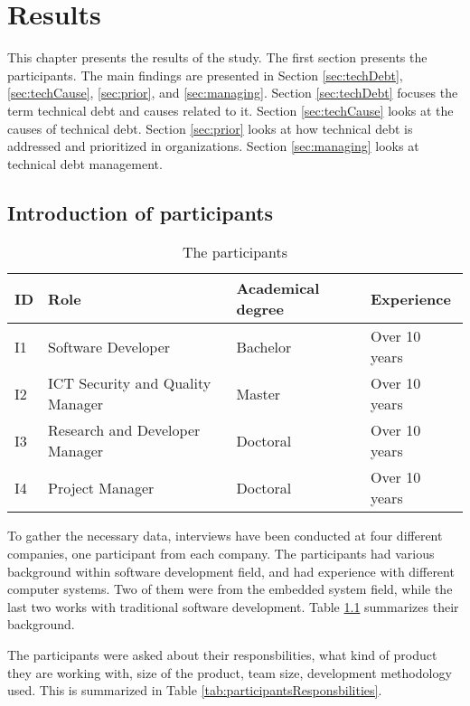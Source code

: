 \chapter{Results}
This chapter presents the results of the study. The first section presents the participants. The main findings are presented in Section \ref{sec:techDebt}, \ref{sec:techCause}, \ref{sec:prior}, and \ref{sec:managing}. Section \ref{sec:techDebt} focuses the term technical debt and causes related to it. Section \ref{sec:techCause} looks at the causes of technical debt. Section \ref{sec:prior} looks at how technical debt is addressed and prioritized in organizations. Section \ref{sec:managing} looks at technical debt management.

\section{Introduction of participants}
\label{sec:background}

\begin{table}[ht!]
	\centering
    \begin{tabular}{|p{1cm}|p{4cm}|p{4cm}|p{4cm}|}
    \hline
    \textbf{ID} & \textbf{Role} & \textbf{Academical degree} & \textbf{Experience}    \\ \hline
    I1 & Software Developer               & Bachelor          & Over 10 years \\ \hline
    I2 & ICT Security and Quality Manager & Master            & Over 10 years \\ \hline
    I3 & Research and Developer Manager   & Doctoral          & Over 10 years \\ \hline
    I4 & Project Manager                  & Doctoral          & Over 10 years \\ \hline
    \end{tabular}
    \caption{The participants} \label{tab:participants}
\end{table}

To gather the necessary data, interviews have been conducted at four different companies, one participant from each company. The participants had various background within software development field, and had experience with different computer systems. Two of them were from the embedded system field, while the last two works with traditional software development. Table \ref{tab:participants} summarizes their background.

The participants were asked about their responsbilities, what kind of product they are working with, size of the product, team size, development methodology used. This is summarized in Table \ref{tab:participantsResponsbilities}.

